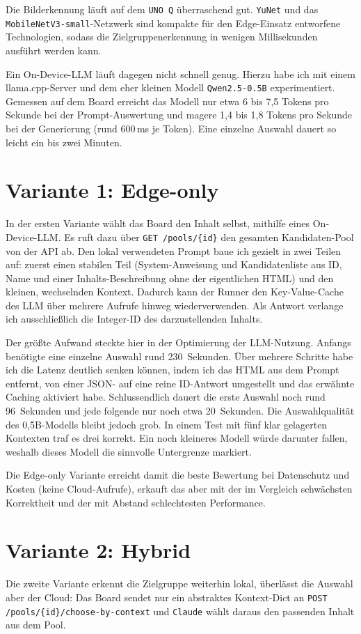 \documentclass[a4paper, 12pt]{article}
\begin{document}
Die Bilderkennung läuft auf dem \texttt{UNO Q} überraschend gut. \texttt{YuNet} und das \texttt{MobileNetV3-small}-Netzwerk sind kompakte für den Edge-Einsatz entworfene Technologien, sodass die Zielgruppenerkennung in wenigen Millisekunden ausführt werden kann. 

Ein On-Device-LLM läuft dagegen nicht schnell genug. Hierzu habe ich mit einem llama.cpp-Server \autocite{llamacpp} und dem eher kleinen Modell \texttt{Qwen2.5-0.5B} experimentiert. Gemessen auf dem Board erreicht das Modell nur etwa 6 bis 7{,}5 Tokens pro Sekunde bei der Prompt-Auswertung und magere 1{,}4 bis 1{,}8 Tokens pro Sekunde bei der Generierung (rund 600\,ms je Token). Eine einzelne Auswahl dauert so leicht ein bis zwei Minuten.

\section*{Variante 1: Edge-only}
In der ersten Variante wählt das Board den Inhalt selbst, mithilfe eines On-Device-LLM. Es ruft dazu über \texttt{GET /pools/\{id\}} den gesamten Kandidaten-Pool von der API ab. Den lokal verwendeten Prompt baue ich gezielt in zwei Teilen auf: zuerst einen stabilen Teil (System-Anweisung und Kandidatenliste aus ID, Name und einer Inhalts-Beschreibung ohne der eigentlichen HTML) und den kleinen, wechselnden Kontext. Dadurch kann der Runner den Key-Value-Cache des LLM über mehrere Aufrufe hinweg wiederverwenden. Als Antwort verlange ich ausschließlich die Integer-ID des darzustellenden Inhalts. 

Der größte Aufwand steckte hier in der Optimierung der LLM-Nutzung. Anfangs benötigte eine einzelne Auswahl rund 230~Sekunden. Über mehrere Schritte habe ich die Latenz deutlich senken können, indem ich das HTML aus dem Prompt entfernt, von einer JSON- auf eine reine ID-Antwort umgestellt und das erwähnte Caching aktiviert habe. Schlussendlich dauert die erste Auswahl noch rund 96~Sekunden und jede folgende nur noch etwa 20~Sekunden. Die Auswahlqualität des 0,5B-Modells bleibt jedoch grob. In einem Test mit fünf klar gelagerten Kontexten traf es drei korrekt. Ein noch kleineres Modell würde darunter fallen, weshalb dieses Modell die sinnvolle Untergrenze markiert. 

Die Edge-only Variante erreicht damit die beste Bewertung bei Datenschutz und Kosten (keine Cloud-Aufrufe), erkauft das aber mit der im Vergleich schwächsten Korrektheit und der mit Abstand schlechtesten Performance.

\section*{Variante 2: Hybrid}
Die zweite Variante erkennt die Zielgruppe weiterhin lokal, überlässt die Auswahl aber der Cloud: Das Board sendet nur ein abstraktes Kontext-Dict an \texttt{POST /pools/\{id\}/\allowbreak choose-by-context} und \texttt{Claude} wählt daraus den passenden Inhalt aus dem Pool.
\end{document}

